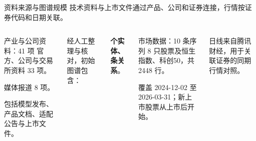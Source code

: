 \begin{frame}{资料来源与图谱规模}\relax
技术资料与上市文件通过产品、公司和证券连接，行情按证券代码和日期关联。
\par\vspace{2mm}
\begin{columns}[T,onlytextwidth]
\begin{block}{产业与公司资料：41 项}
官方、公司与交易所资料 33 项。\par
媒体报道 8 项。\par\vspace{1mm}
包括模型发布、产品文档、适配公告与上市文件\Cite{deepseek-r1,qwen3,glm5}。
\end{block}
\par\vspace{1mm}
经人工整理与核对，初始图谱包含：\par
\textbf{\GraphNodeCount{} 个实体、\GraphEdgeCount{} 条关系}。
\begin{block}{市场数据：10 条序列}
8 只股票及恒生指数、科创50，共 2448 行。\par\vspace{1mm}
覆盖 2024-12-02 至 2026-03-31；新上市股票从上市后开始。
\end{block}
\par\vspace{1mm}
日线来自腾讯财经，用于关联证券的同期行情对照。
\end{columns}
\end{frame}
